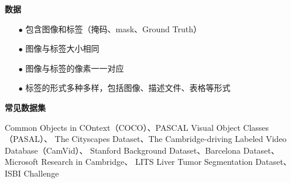 \begin{frame}
    \noindent\large\textbf{数据}

    \begin{itemize}
    \item[$ \bullet $]  包含图像和标签（掩码、mask、Ground Truth）

    \item[$ \bullet $]  图像与标签大小相同

    \item[$ \bullet $]  图像与标签的像素一一对应

    \item[$ \bullet $] 标签的形式多种多样，包括图像、描述文件、表格等形式
    \end{itemize}

    \vspace{1em}
        \begin{figure}
    \end{figure}

%
\end{frame}


\begin{frame}
    \noindent\large\textbf{常见数据集}

%
%
%
%

    \vspace{1em} \small
    Common Objects in COntext（COCO）、PASCAL Visual Object Classes（PASAL）、
    The Cityscapes Dataset、The Cambridge-driving Labeled Video Database（CamVid）、
    Stanford Background Dataset、Barcelona Dataset、Microsoft Research in Cambridge、
    LITS Liver Tumor Segmentation Dataset、ISBI Challenge
\end{frame}



